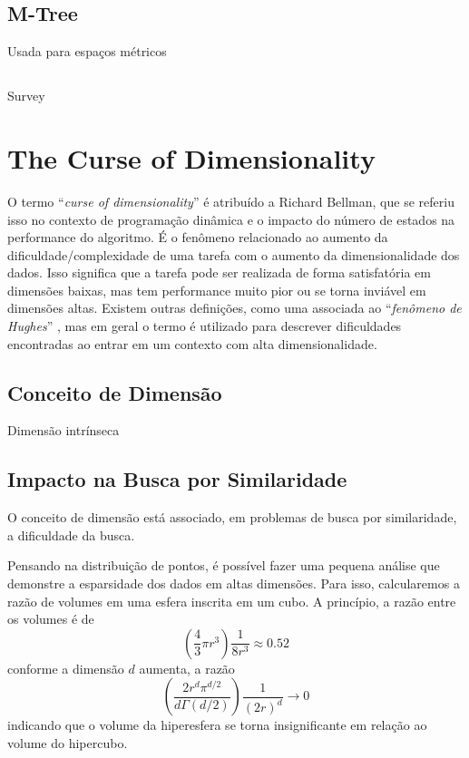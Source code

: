 \subsection{M-Tree}

Usada para espaços métricos

\cite{mtree:ciaccia1997}

\subsection{}

Survey \cite{multidimensionalmethods:gaede1998}

\section{The Curse of Dimensionality}

O termo ``\textit{curse of dimensionality}'' é atribuído a Richard Bellman, que se referiu isso no contexto de programação dinâmica e o impacto do número de estados na performance do algoritmo. É o fenômeno relacionado ao aumento da dificuldade/complexidade de uma tarefa com o aumento da dimensionalidade dos dados. Isso significa que a tarefa pode ser realizada de forma satisfatória em dimensões baixas, mas tem performance muito pior ou se torna inviável em dimensões altas. Existem outras definições, como uma associada ao ``\textit{fenômeno de Hughes}'' \cite{meanacc:hughes1968}, mas em geral o termo é utilizado para descrever dificuldades encontradas ao entrar em um contexto com alta dimensionalidade. 

\subsection{Conceito de Dimensão}

Dimensão intrínseca

\subsection{Impacto na Busca por Similaridade}

O conceito de dimensão está associado, em problemas de busca por similaridade, a dificuldade da busca.

Pensando na distribuição de pontos, é possível fazer uma pequena análise que demonstre a esparsidade dos dados em altas dimensões. Para isso, calcularemos a razão de volumes em uma esfera inscrita em um cubo. A princípio, a razão entre os volumes é de
$$\left(\frac{4}{3} \pi r^3\right)\frac{1}{8r^3} \approx 0.52$$
conforme a dimensão $d$ aumenta, a razão 
$$\left(\frac{2r^d\pi^{d/2}}{d\Gamma(d/2)}\right)\frac{1}{(2r)^d} \to 0$$
indicando que o volume da hiperesfera se torna insignificante em relação ao volume do hipercubo. \cite{cursedim:wiki}

